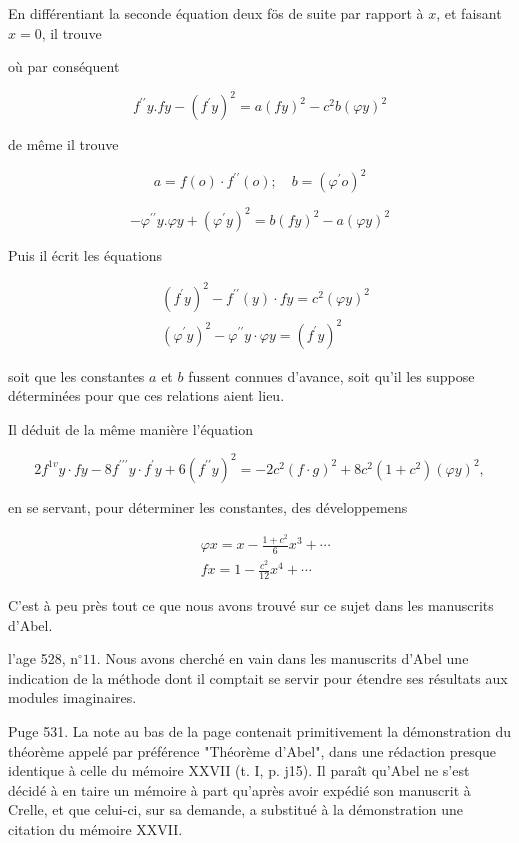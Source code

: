 \documentclass{article}
\begin{document}
En différentiant la seconde équation deux fös de suite par rapport à \(x\), et faisant \(x=0\), il trouve

où par conséquent

\[
f^{\prime \prime} y . f y-\left(f^{\prime} y\right)^{2}=a(f y)^{2}-c^{2} b(\varphi y)^{2}
\]

de même il trouve

\[
a=f(o) \cdot f^{\prime \prime}(o) ; \quad b=\left(\varphi^{\prime} o\right)^{2}
\]

\[
-\varphi^{\prime \prime} y . \varphi y+\left(\varphi^{\prime} y\right)^{2}=b(f y)^{2}-a(\varphi y)^{2}
\]

Puis il écrit les équations

\[
\begin{aligned}
& \left(f^{\prime} y\right)^{2}-f^{\prime \prime}(y) \cdot f y=c^{2}(\varphi y)^{2} \\
& \left(\varphi^{\prime} y\right)^{2}-\varphi^{\prime \prime} y \cdot \varphi y=\left(f^{\prime} y\right)^{2}
\end{aligned}
\]

soit que les constantes \(a\) et \(b\) fussent connues d'avance, soit qu'il les suppose déterminées pour que ces relations aient lieu.

Il déduit de la même manière l'équation

\[
2 f^{1 v} y \cdot f y-8 f^{\prime \prime \prime} y \cdot f^{\prime} y+6\left(f^{\prime \prime} y\right)^{2}=-2 c^{2}(f \cdot g)^{2}+8 c^{2}\left(1+c^{2}\right)(\varphi y)^{2},
\]

en se servant, pour déterminer les constantes, des développemens

\[
\begin{aligned}
& \varphi x=x-\frac{1+c^{2}}{6} x^{3}+\cdots \\
& f x=1-\frac{c^{2}}{12} x^{4}+\cdots
\end{aligned}
\]

C'est à peu près tout ce que nous avons trouvé sur ce sujet dans les manuscrits d'Abel.

l'age 528, \(\mathrm{n}^{\circ} 11\). Nous avons cherché en vain dans les manuscrits d'Abel une indication de la méthode dont il comptait se servir pour étendre ses résultats aux modules imaginaires.

Puge 531. La note au bas de la page contenait primitivement la démonstration du théorème appelé par préférence "Théorème d'Abel", dans une rédaction presque identique à celle du mémoire XXVII (t. I, p. j15). Il paraît qu'Abel ne s'est décidé à en taire un mémoire à part qu'après avoir expédié son manuscrit à Crelle, et que celui-ci, sur sa demande, a substitué à la démonstration une citation du mémoire XXVII.
\end{document}
